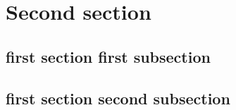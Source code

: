 \documentclass[class=article, crop=false]{standalone}
\begin{document}
\section{Second section}

\subsection{first section first subsection}

\blindtext

\subsection{first section second subsection}

\blindtext
\end{document}
